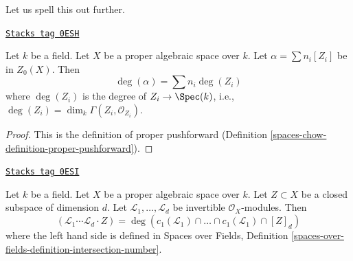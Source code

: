 Let us spell this out further.

\begin{lemma}
\label{spaces-chow-lemma-spell-out-degree-zero-cycle}
\href{https://stacks.math.columbia.edu/tag/0ESH}{\texttt{Stacks tag 0ESH}}

Let $k$ be a field. Let $X$ be a proper algebraic space over $k$.
Let $\alpha = \sum n_i[Z_i]$ be in $Z_0(X)$. Then
$$
\deg(\alpha) = \sum n_i\deg(Z_i)
$$
where $\deg(Z_i)$ is the degree of $Z_i \to \Spec(k)$, i.e.,
$\deg(Z_i) = \dim_k \Gamma(Z_i, \mathcal{O}_{Z_i})$.
\end{lemma}

\begin{proof}
This is the definition of proper pushforward
(Definition \ref{spaces-chow-definition-proper-pushforward}).
\end{proof}

\begin{lemma}
\label{spaces-chow-lemma-degrees-and-numerical-intersections}
\href{https://stacks.math.columbia.edu/tag/0ESI}{\texttt{Stacks tag 0ESI}}

Let $k$ be a field. Let $X$ be a proper algebraic space over $k$.
Let $Z \subset X$ be a closed subspace of dimension $d$.
Let $\mathcal{L}_1, \ldots, \mathcal{L}_d$ be invertible
$\mathcal{O}_X$-modules. Then
$$
(\mathcal{L}_1 \cdots \mathcal{L}_d \cdot Z) =
\deg(
c_1(\mathcal{L}_1) \cap \ldots \cap c_1(\mathcal{L}_1) \cap [Z]_d)
$$
where the left hand side is defined in
Spaces over Fields, Definition
\ref{spaces-over-fields-definition-intersection-number}.
\end{lemma}


